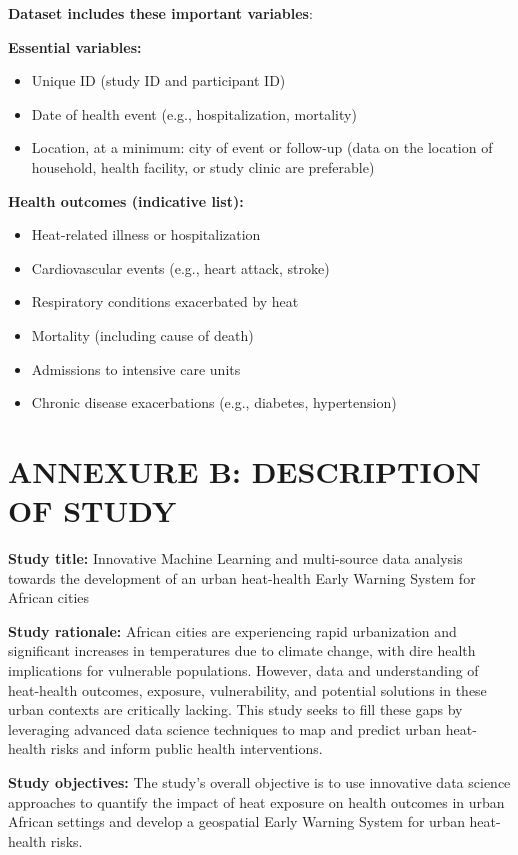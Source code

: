 \documentclass[12pt,letterpaper]{article}
\begin{document}
\textbf{Dataset includes these important variables}:

\textbf{Essential variables:}
\begin{itemize}
    \item Unique ID (study ID and participant ID)
    \item Date of health event (e.g., hospitalization, mortality)
    \item Location, at a minimum: city of event or follow-up (data on the location of household, health facility, or study clinic are preferable)
\end{itemize}

\textbf{Health outcomes (indicative list):}
\begin{itemize}
    \item Heat-related illness or hospitalization
    \item Cardiovascular events (e.g., heart attack, stroke)
    \item Respiratory conditions exacerbated by heat
    \item Mortality (including cause of death)
    \item Admissions to intensive care units
    \item Chronic disease exacerbations (e.g., diabetes, hypertension)
\end{itemize}

\section*{ANNEXURE B: DESCRIPTION OF STUDY}

\textbf{Study title:} Innovative Machine Learning and multi-source data analysis towards the development of an urban heat-health Early Warning System for African cities

\textbf{Study rationale:} African cities are experiencing rapid urbanization and significant increases in temperatures due to climate change, with dire health implications for vulnerable populations. However, data and understanding of heat-health outcomes, exposure, vulnerability, and potential solutions in these urban contexts are critically lacking. This study seeks to fill these gaps by leveraging advanced data science techniques to map and predict urban heat-health risks and inform public health interventions.

\textbf{Study objectives:} The study's overall objective is to use innovative data science approaches to quantify the impact of heat exposure on health outcomes in urban African settings and develop a geospatial Early Warning System for urban heat-health risks.
\end{document}
